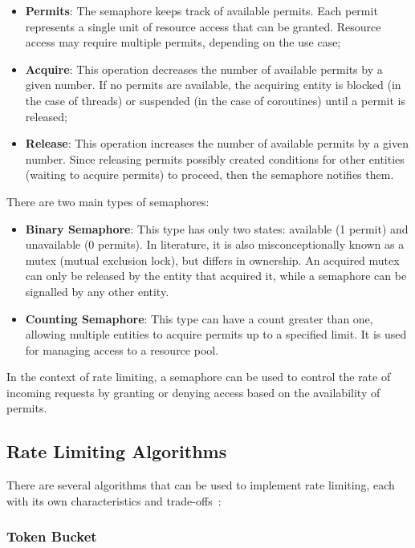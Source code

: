 \begin{itemize}
    \item \textbf{Permits}: The semaphore keeps track of available permits.
    Each permit represents a single unit of resource access that can be granted.
    Resource access may require multiple permits, depending on the use case;
    \item \textbf{Acquire}: This operation decreases the number of available permits by a given number.
    If no permits are available, the acquiring entity is blocked (in the case of threads) or suspended (in the case of coroutines) until a permit is released;
    \item \textbf{Release}: This operation increases the number of available permits by a given number.
    Since releasing permits possibly created conditions for other entities (waiting to acquire permits) to proceed, then the semaphore notifies them.
\end{itemize}

There are two main types of semaphores:
\begin{itemize}
    \item \textbf{Binary Semaphore}:
    This type has only two states: available (1 permit) and unavailable (0 permits).
    In literature, it is also misconceptionally known as a mutex (mutual exclusion lock), but differs in ownership.
    An acquired mutex can only be released by the entity that acquired it, while a semaphore can be signalled by any other entity.
    \item \textbf{Counting Semaphore}: This type can have a count greater than one, allowing multiple entities to acquire permits up to a specified limit.
    It is used for managing access to a resource pool.
\end{itemize}

In the context of rate limiting, a semaphore can be used to control the rate of incoming requests by granting or denying access based on the availability of permits.

\subsection{Rate Limiting Algorithms}\label{subsec:rate-limiter-algorithms}

There are several algorithms that can be used to implement rate limiting,
each with its own characteristics and trade-offs~\cite{medium-rate-limiting-algorithms,nordic-apis-rate-limiting-algorithms}:

\subsubsection{Token Bucket}\label{subsubsec:token-bucket-algorithm}


